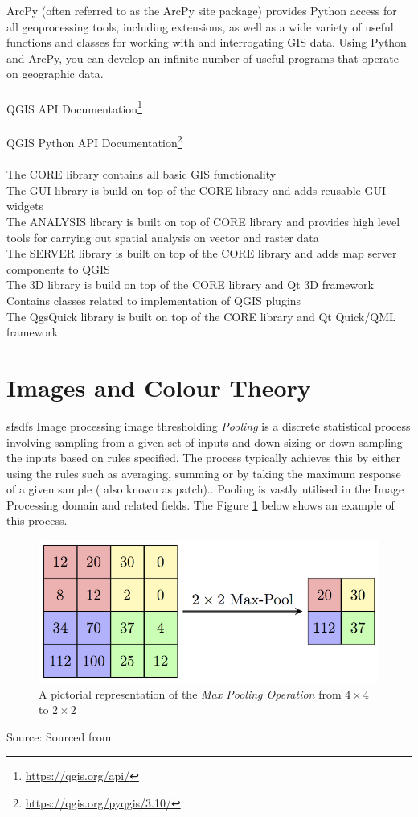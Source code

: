 ArcPy (often referred to as the ArcPy site package) provides Python access for all geoprocessing tools, including extensions, as well as a wide variety of useful functions and classes for working with and interrogating GIS data. Using Python and ArcPy, you can develop an infinite number of useful programs that operate on geographic data.
\\\\
QGIS API Documentation\footnote{\url{https://qgis.org/api/}}
\\\\
QGIS Python API Documentation\footnote{\url{https://qgis.org/pyqgis/3.10/}}
\\\\
The CORE library contains all basic GIS functionality\\
The GUI library is build on top of the CORE library and adds reusable GUI widgets\\
The ANALYSIS library is built on top of CORE library and provides high level tools for carrying out spatial analysis on vector and raster data\\
The SERVER library is built on top of the CORE library and adds map server components to QGIS\\
The 3D library is build on top of the CORE library and Qt 3D framework\\
Contains classes related to implementation of QGIS plugins\\
The QgsQuick library is built on top of the CORE library and Qt Quick/QML framework
\section{Images and Colour Theory}
\label{sec:col}
sfsdfs \cite{imgp} Image processing
image thresholding \cite{shap}
\textit{Pooling} is a discrete statistical process involving sampling from a given set of inputs and down-sizing or down-sampling the inputs based on rules specified. The process typically achieves this by either using the rules such as averaging, summing or by taking the maximum response of a given sample ( also known as patch).\cite{cnn,pool,murr}. Pooling is vastly utilised in the Image Processing domain and related fields. The Figure \ref{fig:pool} below shows an example of this process.
\begin{figure}[H]
\centering
\includegraphics[width=1\textwidth]{Figures/Chapter3/pool}
\caption{A pictorial representation of the \textit{Max Pooling Operation} from $4 \times 4$ to $2 \times 2$}
\label{fig:pool}
\end{figure}
\begin{center}
Source: Sourced from \cite{pool}
\end{center}